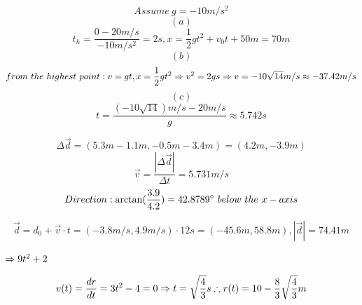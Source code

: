 \documentclass{homework}
\begin{document}
\question

$$ Assume \ g = -10m/s^2
$$
$$(a)
$$
$$ t_h = \frac{0 - 20m/s}{-10m/s^2} = 2s, x = \frac{1}{2}gt^2 + v_0t + 50m = 70m
$$
$$(b)
$$
$$ from \ the \ highest \ point: v = gt, x = \frac{1}{2}gt^2 \Rightarrow v^2 = 2gs \Rightarrow v = -10\sqrt{14} m/s \approx -37.42m/s
$$
$$(c)
$$
$$ t = \frac{(-10\sqrt{14})m/s - 20m/s}{g} \approx 5.742s
$$

\question

$$ \Delta\vec{d} = (5.3m - 1.1m, -0.5m - 3.4m) = (4.2m, -3.9m)
$$
$$ \vec{v} = \frac{|\Delta\vec{d}|}{\Delta t} = 5.731m/s
$$
$$ Direction: \arctan(\frac{3.9}{4.2}) = 42.8789 ^\circ \ below \ the \ x-axis
$$

\question

$$ \vec{d} = d_0 + \vec{v} \cdot t = (-3.8m/s, 4.9m/s) \cdot 12s = (-45.6m, 58.8m), |\vec{d}| = 74.41m
$$

\question
$ \Rightarrow 9t^2 + 2
$

\question
$$ v(t) = \frac{dr}{dt} = 3t^2 - 4 = 0 \Rightarrow t = \sqrt{\frac{4}{3}}s \therefore r(t) = 10 - \frac{8}{3}\sqrt{\frac{4}{3}} m
$$
\end{document}
